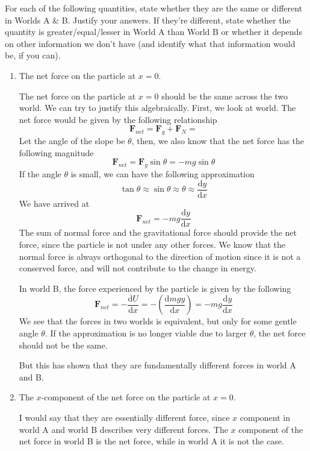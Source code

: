 \documentclass[12pt]{article}
\newcommand{\dydx}[2]{\frac{\text{d} #1}{\text{d} #2}}
\newcommand{\paren}[1]{\left( #1 \right)}
\begin{document}
For each of the following quantities, state whether they are the same or different in Worlds A \& B. Justify your answers. If they’re different, state whether the quantity is greater/equal/lesser in World A than World B or whether it depends on other information we don’t have (and identify what that information would be, if you can).

\begin{enumerate}
    \item The net force on the particle at \(x = 0\).

        The net force on the particle at $x=0$ should be the same across the two world. We can try to justify this algebraically. First, we look at world. The net force would be given by the following relationship
        \[
        \mathbf{F}_{net} = \mathbf{F}_g + \mathbf{F}_N =
        \]
        Let the angle of the slope be $\theta$, then, we also know that the net force has the following magnitude
        \[
        \mathbf{F}_{net} = \mathbf{F}_g\sin\theta = -mg\sin\theta
        \]
        If the angle $\theta$ is small, we can have the following approximation
        \[
        \tan\theta \approx \sin\theta \approx \theta \approx \dydx{y}{x}
        \]
        We have arrived at
        \[
        \mathbf{F}_{net} = -mg\dydx{y}{x}
        \]
        The sum of normal force and the gravitational force should provide the net force, since the particle is not under any other forces. We know that the normal force is always orthogonal to the direction of motion since it is not a conserved force, and will not contribute to the change in energy. 

        In world B, the force experienced by the particle is given by the following
        \[
        \mathbf{F}_{net} = -\dydx{U}{x} = -\paren{\dydx{mgy}{x}} = -mg\dydx{y}{x}
        \]
        We see that the forces in two worlds is equivalent, but only for some gentle angle $\theta$. If the approximation is no longer viable due to larger $\theta$, the net force should not be the same. 

        But this has shown that they are fundamentally different forces in world A and B. 
        
    \item The \(x\)-component of the net force on the particle at \(x = 0\).

        I would say that they are essentially different force, since $x$ component in world A and world B describes very different forces. The $x$ component of the net force in world B is the net force, while in world A it is not the case. 
    

\end{enumerate}
\end{document}
